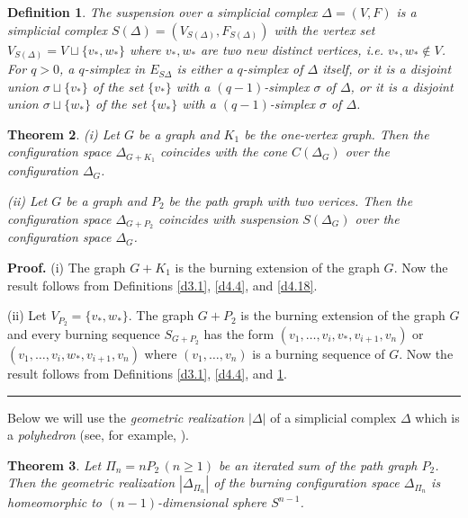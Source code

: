 \documentclass[a4paper, 11pt]{article}
\newtheorem{theorem}{Theorem}[section]
\newtheorem{definition}[theorem]{Definition}
\newenvironment{proof}[1][Proof]{\textbf{#1.} }{\ \rule{0.5em}{0.5em}}
\begin{document}
\begin{definition}\label{d4.19} \rm The \emph{suspension over a simplicial complex} 
$\Delta=(V,F)$ is a simplicial complex 
$S(\Delta)=(V_{S(\Delta)}, F_{S(\Delta)})$ with the  vertex set 
 $V_{S(\Delta)}= V\sqcup\{v_*, w_*\}$  where $v_*, w_*$ are two  new distinct vertices, i.e. $v_*,w_*\not \in V$. For $q>0$, a 
$q$-simplex in $E_{S\Delta}$
is either a $q$-simplex of $\Delta$  itself, or it is  a disjoint union $\sigma \sqcup \{v_*\}$ of the set  $ \{v_*\}$  with a $(q - 1)$-simplex  $\sigma$  of $\Delta$, or
 it is  a disjoint union $\sigma \sqcup \{w_*\}$ of the set  $ \{w_*\}$  with a $(q - 1)$-simplex  $\sigma$  of $\Delta$.
\end{definition} 




\begin{theorem}\label{t4.20} {\rm (i)} Let $G$ be a graph and $K_1$ be  the one-vertex graph. Then the  configuration space $\Delta_{G+K_1}$ coincides with the cone $C(\Delta_G)$ over the  configuration $\Delta_G$. 


{\rm(ii)} Let $G$ be a graph  and $P_2$ be the path graph with two verices.  Then the configuration space $\Delta_{G+P_2}$ coincides with suspension 
$S(\Delta_G)$ over the configuration space  $\Delta_G$. 
\end{theorem}
\begin{proof} (i)  The graph   $G+K_1$  is the burning extension  of the graph $G$.  Now the result follows from Definitions \ref{d3.1}, \ref{d4.4}, and \ref{d4.18}. 

(ii)  Let $V_{P_2}=\{v_*,w_*\}$. The graph $G+P_2$ is the burning extension  of the graph $G$ and every burning sequence $S_{G+P_2}$  has the form 
$
(v_1, \dots, v_i, v_*, v_{i+1}, v_n)$ or 
$
(v_1, \dots, v_i, w_*, v_{i+1}, v_n)
$ 
where $(v_1, \dots, v_n)$ is a burning sequence  of $G$.  Now the result follows from Definitions \ref{d3.1}, \ref{d4.4}, and \ref{d4.19}.
\end{proof}

Below we will use the   \emph{geometric realization $|\Delta|$} of a simplicial complex $\Delta$ which is a \emph{polyhedron}  (see, for example, \cite[\S 1.5]{Matousek}).

\begin{theorem}\label{t4.21}  Let $\Pi_n=nP_2\, (n\geq 1)$ be an iterated sum of the path graph $P_2$. Then the geometric realization  $|\Delta_{\Pi_n}|$ of the burning configuration space  $\Delta_{\Pi_n}$ is homeomorphic to  $(n-1)$-dimensional sphere $S^{n-1}$.  
\end{theorem}
\end{document}
